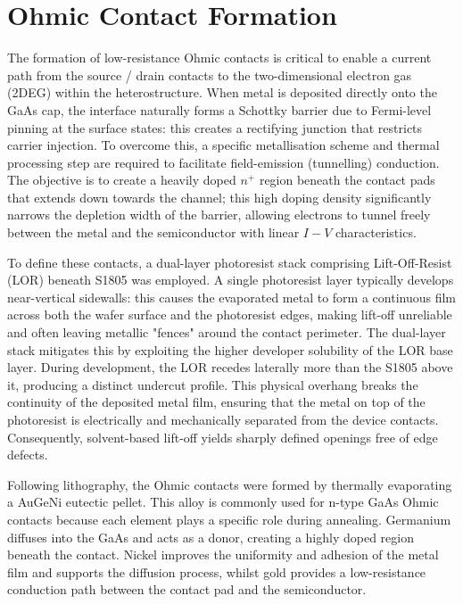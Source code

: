 \vspace{1mm}

\section{Ohmic Contact Formation}

The formation of low-resistance Ohmic contacts is critical to enable a current path  
from the source / drain contacts to the two-dimensional electron gas (2DEG) within the heterostructure. 
When metal is deposited directly onto the GaAs cap, the interface naturally 
forms a Schottky barrier due to Fermi-level pinning at the surface states: 
this creates a rectifying junction that restricts carrier injection. To 
overcome this, a specific metallisation scheme and thermal processing step are 
required to facilitate field-emission (tunnelling) conduction. The objective 
is to create a heavily doped $n^{+}$ region beneath the contact pads that 
extends down towards the channel; this high doping density significantly 
narrows the depletion width of the barrier, allowing electrons to tunnel 
freely between the metal and the semiconductor with linear $I-V$ 
characteristics.

\vspace{1mm}

To define these contacts, a dual-layer photoresist stack comprising 
Lift-Off-Resist (LOR) beneath S1805 was employed. A single photoresist 
layer typically develops near-vertical sidewalls: this causes the evaporated 
metal to form a continuous film across both the wafer surface and the 
photoresist edges, making lift-off unreliable and often leaving metallic 
"fences" around the contact perimeter. The dual-layer stack mitigates this by 
exploiting the higher developer solubility of the LOR base layer. During 
development, the LOR recedes laterally more than the S1805 above it, 
producing a distinct undercut profile. This physical overhang breaks the 
continuity of the deposited metal film, ensuring that the metal on top of 
the photoresist is electrically and mechanically separated from the device 
contacts. Consequently, solvent-based lift-off yields sharply defined 
openings free of edge defects.

\vspace{1mm}



\vspace{1mm}

Following lithography, the Ohmic contacts were formed by thermally evaporating 
a AuGeNi eutectic pellet. This alloy is commonly used for n-type 
GaAs Ohmic contacts because each element plays a specific role during annealing. 
Germanium diffuses into the GaAs and acts as a donor, creating a highly doped 
region beneath the contact. Nickel improves the uniformity and adhesion of the 
metal film and supports the diffusion process, whilst gold provides a low-resistance 
conduction path between the contact pad and the semiconductor.

